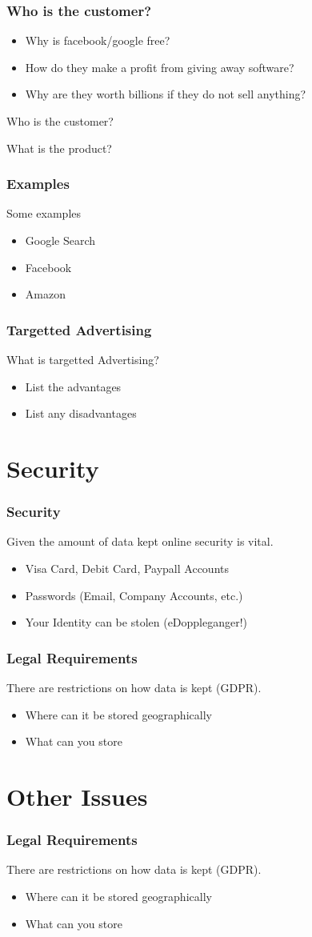 \documentclass{beamer}
\begin{document}
        \begin{frame}
  	\frametitle{Who is the customer?}
  	
  	\begin{itemize}
  		\item Why is facebook/google free?
  		\item How do they make a profit from giving away software?
  		\item Why are they worth billions if they do not sell anything?
  	\end{itemize}
    Who is the customer?
    
    What is the product?
  \end{frame}
  
          \begin{frame}
  	\frametitle{Examples}
  	Some examples
  	\begin{itemize}
  		\item Google Search
  		\item Facebook
  		\item Amazon
  	\end{itemize}
  \end{frame}
  
            \begin{frame}
  	\frametitle{Targetted Advertising}
  	What is targetted Advertising?
  	\begin{itemize}
  		\item List the advantages
  		\item List any disadvantages
  	\end{itemize}
  \end{frame}
  \section{Security}
             \begin{frame}
  	\frametitle{Security}
  	Given the amount of data kept online security is vital.
  	\begin{itemize}
  		\item Visa Card, Debit Card, Paypall Accounts
  		\item Passwords (Email, Company Accounts, etc.)
  		\item Your Identity can be stolen (eDoppleganger!)
  	\end{itemize}
  \end{frame} 
               \begin{frame}
  	\frametitle{Legal Requirements}
  	There are restrictions on how data is kept (GDPR).
  	\begin{itemize}
  		\item Where can it be stored geographically
  		\item What can you store
  	\end{itemize}
  \end{frame} 
  \section{Other Issues}
                 \begin{frame}
  	\frametitle{Legal Requirements}
  	There are restrictions on how data is kept (GDPR).
  	\begin{itemize}
  		\item Where can it be stored geographically
  		\item What can you store
  	\end{itemize}
  \end{frame} 
  
\end{document}
